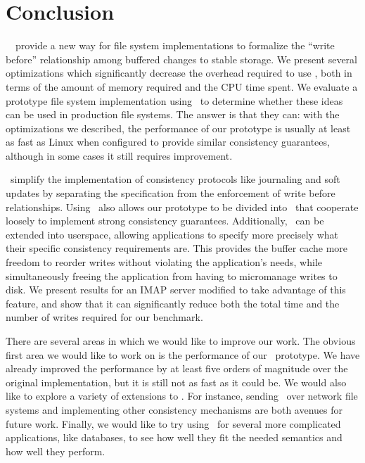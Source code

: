 \section{Conclusion}
\label{sec:conclusion}

\Kudos\ \patches\ provide a new way for file system implementations to formalize
the ``write before'' relationship among buffered changes to stable storage.
%
We present several optimizations which significantly decrease the overhead
required to use \patches, both in terms of the amount of memory required and the
CPU time spent.
%
We evaluate a prototype file system implementation using \patches\ to determine
whether these ideas can be used in production file systems.
%
The answer is that they can: with the optimizations we described, the
performance of our prototype is usually at least as fast as Linux when
configured to provide similar consistency guarantees, although in some cases it
still requires improvement.


\Patches\ simplify the implementation of consistency protocols like journaling
and soft updates by separating the specification from the enforcement of write
before relationships.
%
Using \patches\ also allows our prototype to be divided into \modules\ that
cooperate loosely to implement strong consistency guarantees.
%
Additionally, \patches\ can be extended into userspace, allowing applications to
specify more precisely what their specific consistency requirements are.
%
This provides the buffer cache more freedom to reorder writes without violating
the application's needs, while simultaneously freeing the application from
having to micromanage writes to disk.
%
We present results for an IMAP server modified to take advantage of this
feature, and show that it can significantly reduce both the total time and the
number of writes required for our benchmark.


There are several areas in which we would like to improve our work. The obvious
first area we would like to work on is the performance of our \Kudos\ prototype.
%
We have already improved the performance by at least five orders of magnitude
over the original implementation, but it is still not as fast as it could be.
%
We would also like to explore a variety of extensions to \Kudos. For instance,
sending \patches\ over network file systems and implementing other consistency
mechanisms are both avenues for future work.
%
Finally, we would like to try using \patchgroups\ for several more complicated
applications, like databases, to see how well they fit the needed semantics and
how well they perform.

